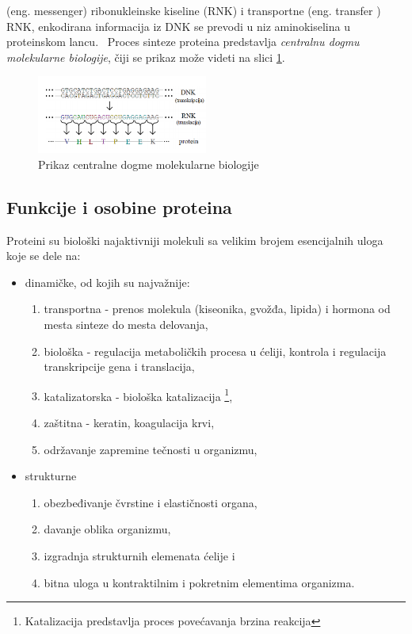 (eng. messenger) ribonukleinske kiseline (RNK) i transportne (eng. transfer
) RNK, enkodirana informacija iz DNK se prevodi u niz aminokiselina u
proteinskom lancu.~\cite{JKd}
Proces sinteze proteina predstavlja \textit{centralnu dogmu molekularne biologije}, čiji se prikaz može videti na slici \ref{fig:dogma}.
\begin{figure}[h]
	\centering
    \includegraphics[width=0.5\textwidth]{Figures/BO/dogma.png}
    \caption{Prikaz centralne dogme molekularne biologije~\cite{JKd}}
    \label{fig:dogma}
\end{figure}

\subsection{Funkcije i osobine proteina}
Proteini su biološki najaktivniji molekuli sa velikim brojem esencijalnih uloga koje se dele na:
\begin{itemize}
\item dinamičke, od kojih su najvažnije:
\begin{enumerate} 
\item transportna - prenos molekula (kiseonika, gvožđa, lipida) i hormona od mesta sinteze do mesta delovanja,
\item biološka - regulacija metaboličkih procesa u ćeliji, kontrola i regulacija transkripcije gena i translacija,
\item katalizatorska - biološka katalizacija \footnote{Katalizacija predstavlja proces povećavanja brzina reakcija},
\item zaštitna - keratin, koagulacija krvi,
\item održavanje zapremine tečnosti u organizmu,
\end{enumerate}
\item strukturne
\begin{enumerate}
\item obezbeđivanje čvrstine i elastičnosti organa,
\item davanje oblika organizmu,
\item izgradnja strukturnih elemenata ćelije i
\item bitna uloga u kontraktilnim i pokretnim elementima organizma.
\end{enumerate}
\end{itemize} 

